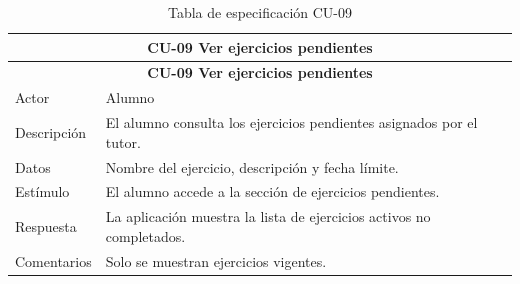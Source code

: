 
\begin{longtable}{|p{4cm}|p{11cm}|}
\caption{Tabla de especificación CU-09}
\label{tab:cu09} \\

\hline
\multicolumn{2}{|c|}{\textbf{CU-09 Ver ejercicios pendientes}} \\
\hline
\endfirsthead

\hline
\multicolumn{2}{|c|}{\textbf{CU-09 Ver ejercicios pendientes}} \\
\hline
\endhead

\hline
\endfoot
\endlastfoot

Actor & Alumno \\
\hline
Descripción & El alumno consulta los ejercicios pendientes asignados por el tutor. \\
\hline
Datos & Nombre del ejercicio, descripción y fecha límite. \\
\hline
Estímulo & El alumno accede a la sección de ejercicios pendientes. \\
\hline
Respuesta & La aplicación muestra la lista de ejercicios activos no completados. \\
\hline
Comentarios & Solo se muestran ejercicios vigentes. \\
\hline

\end{longtable}

